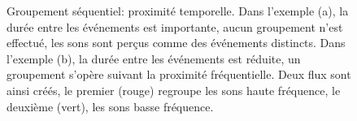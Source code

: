 \begin{figure}[t]
        \myfloatalign
        \caption[Groupement séquentiel: proximité temporelle.]{Groupement séquentiel: proximité temporelle. Dans l'exemple (a), la durée entre les événements est importante, aucun groupement n'est effectué, les sons sont perçus comme des événements distincts. Dans l'exemple (b), la durée entre les événements est réduite, un groupement s'opère suivant la proximité fréquentielle. Deux flux sont ainsi créés, le premier (rouge) regroupe les sons haute fréquence, le deuxième (vert), les sons basse fréquence.}\label{fig:tonesim}
\end{figure}

